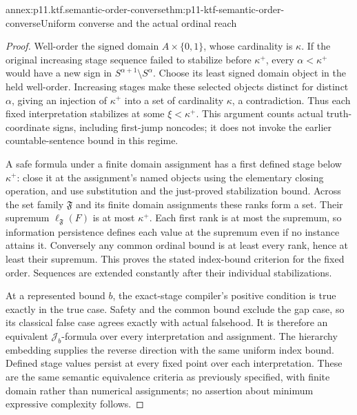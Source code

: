 \begin{annexitem}{annex:p11.ktf.semantic-order-converse}{thm:p11-ktf-semantic-order-converse}{Uniform converse and the actual ordinal reach}
\begin{proof}
Well-order the signed domain \(A\times\{0,1\}\), whose
cardinality is \(\kappa\). If the original increasing stage
sequence failed to stabilize before \(\kappa^+\), every
\(\alpha<\kappa^+\) would have a new sign in
\(S^{\alpha+1}\setminus S^\alpha\). Choose its least
signed domain object in the held well-order. Increasing stages make
these selected objects distinct for distinct \(\alpha\),
giving an injection of \(\kappa^+\) into a set of cardinality
\(\kappa\), a contradiction. Thus each fixed interpretation
stabilizes at some \(\xi<\kappa^+\). This argument counts
actual truth-coordinate signs, including first-jump noncodes; it
does not invoke the earlier countable-sentence bound in this regime.

A safe formula under a finite domain assignment has a first defined
stage below \(\kappa^+\): close it at the assignment's named
objects using the elementary closing operation, and use substitution
and the just-proved stabilization bound. Across the set family
\(\mathfrak F\) and its finite domain assignments these ranks
form a set. Their supremum \(\ell_{\mathfrak F}(F)\) is
at most \(\kappa^+\). Each first rank is at most the
supremum, so information persistence defines each value at the
supremum even if no instance attains it. Conversely any common
ordinal bound is at least every rank, hence at least their supremum.
This proves the stated index-bound criterion for the fixed order.
Sequences are extended constantly after their individual stabilizations.

At a represented bound \(b\), the exact-stage compiler's
positive condition is true exactly in the true case. Safety and
the common bound exclude the gap case, so its classical false
case agrees exactly with actual falsehood. It is therefore an
equivalent \(\mathcal J_b\)-formula over every interpretation
and assignment. The hierarchy embedding supplies the reverse
direction with the same uniform index bound. Defined stage values
persist at every fixed point over each interpretation. These are
the same semantic equivalence criteria as previously specified,
with finite domain rather than numerical assignments; no assertion
about minimum expressive complexity follows.


\end{proof}
\end{annexitem}
